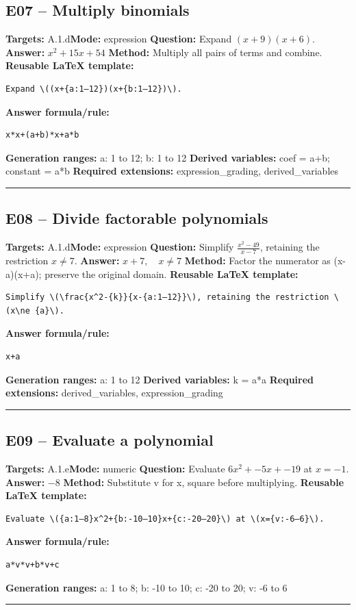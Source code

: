 \documentclass[11pt]{article}
\begin{document}
\subsection{E07 -- Multiply binomials}
\textbf{Targets:} A.1.d\quad\textbf{Mode:} expression
\textbf{Question:} Expand \((x+9)(x+6)\).
\textbf{Answer:} \(x^2+15x+54\)
\textbf{Method:} Multiply all pairs of terms and combine.
\textbf{Reusable LaTeX template:}
\begin{verbatim}
Expand \((x+{a:1–12})(x+{b:1–12})\).
\end{verbatim}
\textbf{Answer formula/rule:}
\begin{verbatim}
x*x+(a+b)*x+a*b
\end{verbatim}
\textbf{Generation ranges:} a: 1 to 12; b: 1 to 12
\textbf{Derived variables:} coef = a+b; constant = a*b
\textbf{Required extensions:} expression\_grading, derived\_variables
\medskip\hrule\medskip
\subsection{E08 -- Divide factorable polynomials}
\textbf{Targets:} A.1.d\quad\textbf{Mode:} expression
\textbf{Question:} Simplify \(\frac{x^2-49}{x-7}\), retaining the restriction \(x\ne 7\).
\textbf{Answer:} \(x+7,\quad x\ne 7\)
\textbf{Method:} Factor the numerator as (x-a)(x+a); preserve the original domain.
\textbf{Reusable LaTeX template:}
\begin{verbatim}
Simplify \(\frac{x^2-{k}}{x-{a:1–12}}\), retaining the restriction \(x\ne {a}\).
\end{verbatim}
\textbf{Answer formula/rule:}
\begin{verbatim}
x+a
\end{verbatim}
\textbf{Generation ranges:} a: 1 to 12
\textbf{Derived variables:} k = a*a
\textbf{Required extensions:} derived\_variables, expression\_grading
\medskip\hrule\medskip
\subsection{E09 -- Evaluate a polynomial}
\textbf{Targets:} A.1.e\quad\textbf{Mode:} numeric
\textbf{Question:} Evaluate \(6x^2+-5x+-19\) at \(x=-1\).
\textbf{Answer:} \(-8\)
\textbf{Method:} Substitute v for x, square before multiplying.
\textbf{Reusable LaTeX template:}
\begin{verbatim}
Evaluate \({a:1–8}x^2+{b:-10–10}x+{c:-20–20}\) at \(x={v:-6–6}\).
\end{verbatim}
\textbf{Answer formula/rule:}
\begin{verbatim}
a*v*v+b*v+c
\end{verbatim}
\textbf{Generation ranges:} a: 1 to 8; b: -10 to 10; c: -20 to 20; v: -6 to 6
\medskip\hrule\medskip
\end{document}

